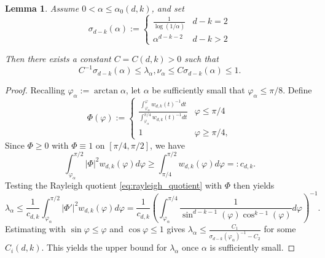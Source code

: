 \documentclass[11pt]{amsart}
\numberwithin{equation}{section}
\numberwithin{figure}{section}
\theoremstyle{plain}
\newtheorem{lem}[thm]{Lemma}
\theoremstyle{definition}
\theoremstyle{remark}
\theoremstyle{plain}
\begin{document}
\begin{lem}\label{lem:first_eigenvalue}
Assume $0 < \alpha \leq \alpha_0(d,k)$, and set
\begin{equation}\label{eq:sigma_d_minus_k}
    \sigma_{d-k}(\alpha) := \begin{cases}
    \frac{1}{\log(1/\alpha)} & d-k=2 \\ \alpha^{d-k-2} & d-k > 2
\end{cases}
\end{equation}

Then there exists a constant $C=C(d,k) > 0$ such that
    \[ C^{-1}\sigma_{d-k}(\alpha) \leq \lambda_\alpha, \nu_{\alpha} \leq C\sigma_{d-k}(\alpha) \leq 1. \]
 
\end{lem}
\begin{proof}
  Recalling $\varphi_\alpha := \arctan \alpha$, let $\alpha$ be sufficiently small that $\varphi_\alpha \leq \pi/8$. Define
    \[ \Phi(\varphi) := \begin{cases}
        \frac{\int_{\varphi_\alpha}^{\varphi} w_{d,k}(t)^{-1} dt}{\int_{\varphi_\alpha}^{\pi/4} w_{d,k}(t)^{-1} dt} & \varphi \leq \pi/4 \\
        1 & \varphi \geq \pi/4,
    \end{cases} \]
     Since $\Phi \geq 0$ with $\Phi\equiv 1$ on $[\pi/4, \pi/2]$, we have
    \[ \int_{\varphi_\alpha}^{\pi/2} |\Phi|^2w_{d,k}(\varphi)d\varphi \geq \int_{\pi/4}^{\pi/2} w_{d,k}(\varphi)d\varphi =: c_{d,k}. \]
    Testing the Rayleigh quotient \eqref{eq:rayleigh_quotient} with $\Phi$ then yields
    \[ \lambda_\alpha \leq \frac{1}{c_{d,k}}\int_{\varphi_\alpha}^{\pi/2} |\Phi'|^2w_{d,k}(\varphi)d\varphi = \frac{1}{c_{d,k}}\left(\int_{\varphi_\alpha}^{\pi/4} \frac{1}{\sin^{d-k-1}(\varphi)\cos^{k-1}(\varphi)}d\varphi\right)^{-1}. \]
    Estimating with $\sin\varphi \leq \varphi$ and $\cos\varphi \leq 1$ gives $\lambda_\alpha \leq \frac{C_1}{\sigma_{d-k}(\varphi_\alpha)^{-1} - C_2}$ for some $C_i(d,k)$. This yields the upper bound for $\lambda_\alpha$ once $\alpha$ is sufficiently small.


\end{proof}
\end{document}

